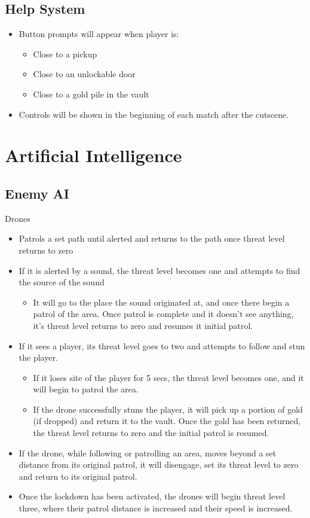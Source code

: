 \documentclass[14pt]{report}
\begin{document}
\section{Help System}

\begin{itemize}
    \item Button prompts will appear when player is:
    \begin{itemize}
        \item Close to a pickup
        \item Close to an unlockable door
        \item Close to a gold pile in the vault
    \end{itemize}
    \item Controls will be shown in the beginning of each match after the cutscene.
\end{itemize}

\chapter{Artificial Intelligence}
\section{Enemy AI}

Drones

\begin{itemize}
    \item Patrols a set path until alerted and returns to the path once threat level returns to zero
    \item If it is alerted by a sound, the threat level becomes one and attempts to find the source of the sound
    \begin{itemize}
        \item It will go to the place the sound originated at, and once there begin a patrol of the area. Once patrol is complete and it doesn’t see anything, it’s threat level returns to zero and resumes it initial patrol.
    \end{itemize}
    \item If it sees a player, its threat level goes to two and attempts to follow and stun the player.
    \begin{itemize}
        \item If it loses site of the player for 5 secs, the threat level becomes one, and it will begin to patrol the area.
        \item If the drone successfully stuns the player, it will pick up a portion of gold (if dropped) and return it to the vault. Once the gold has been returned, the threat level returns to zero and the initial patrol is resumed.
    \end{itemize}
    \item If the drone, while following or patrolling an area, moves beyond a set distance from its original patrol, it will disengage, set its threat level to zero and return to its original patrol.
    \item Once the lockdown has been activated, the drones will begin threat level three, where their patrol distance is increased and their speed is increased.    
\end{itemize}
\end{document}
